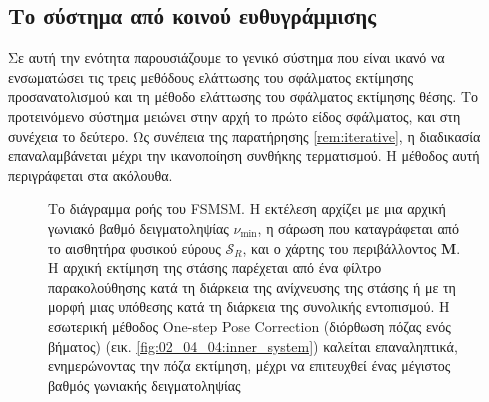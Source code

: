 \subsection{Το σύστημα από κοινού ευθυγράμμισης}


Σε αυτή την ενότητα παρουσιάζουμε το γενικό σύστημα που είναι ικανό να
ενσωματώσει τις τρεις μεθόδους ελάττωσης του σφάλματος εκτίμησης
προσανατολισμού και τη μέθοδο ελάττωσης του σφάλματος εκτίμησης θέσης.  Το
προτεινόμενο σύστημα μειώνει στην αρχή το πρώτο είδος σφάλματος, και στη
συνέχεια το δεύτερο. Ως συνέπεια της παρατήρησης \ref{rem:iterative}, η
διαδικασία επαναλαμβάνεται μέχρι την ικανοποίηση συνθήκης τερματισμού. Η
μέθοδος αυτή περιγράφεται στα ακόλουθα.


\begin{figure}[h]\centering
  
  \caption{\small Το διάγραμμα ροής του FSMSM. Η εκτέλεση αρχίζει με μια αρχική
           γωνιακό βαθμό δειγματοληψίας $\nu_{\min}$, η σάρωση που καταγράφεται
           από το αισθητήρα φυσικού εύρους $\mathcal{S}_R$, και ο χάρτης του
           περιβάλλοντος $\bm{M}$. Η αρχική εκτίμηση της στάσης παρέχεται από
           ένα φίλτρο παρακολούθησης κατά τη διάρκεια της ανίχνευσης της στάσης
           ή με τη μορφή μιας υπόθεσης κατά τη διάρκεια της συνολικής
           εντοπισμού. Η εσωτερική μέθοδος One-step Pose Correction (διόρθωση
           πόζας ενός βήματος) (εικ. \ref{fig:02_04_04:inner_system}) καλείται
           επαναληπτικά, ενημερώνοντας την πόζα εκτίμηση, μέχρι να επιτευχθεί
           ένας μέγιστος βαθμός γωνιακής δειγματοληψίας}
  \label{fig:02_04_04:outer_system}
\end{figure}

